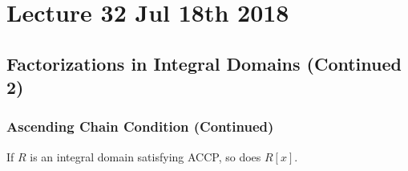 \chapter{Lecture 32 Jul 18th 2018}%
\label{chp:lecture_32_jul_18th_2018}

\section{Factorizations in Integral Domains (Continued 2)}%
\label{sec:factorizations_in_integral_domains_continued_2}

\subsection{Ascending Chain Condition (Continued)}%
\label{sub:ascending_chain_condition_continued}

\begin{thm}
\label{thm:integral_domain_that_satisfies_accp_has_a_polynomial_ring_that_satisfies_accp}
  If $R$ is an integral domain satisfying ACCP, so does $R[x]$.
\end{thm}

